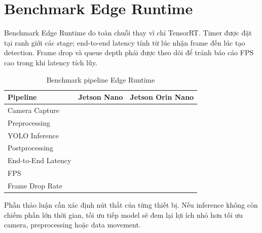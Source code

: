 \section{Benchmark Edge Runtime}

Benchmark Edge Runtime đo toàn chuỗi thay vì chỉ TensorRT. Timer được đặt tại
ranh giới các stage; end-to-end latency tính từ lúc nhận frame đến lúc tạo detection.
Frame drop và queue depth phải được theo dõi để tránh báo cáo FPS cao trong khi
latency tích lũy.

\begin{table}[H]
\centering
\caption{Benchmark pipeline Edge Runtime}
\label{tab:runtime-pipeline-benchmark}
\begin{tabularx}{\textwidth}{L{6cm}YY}
\toprule
\textbf{Pipeline} & \textbf{Jetson Nano} & \textbf{Jetson Orin Nano}\\
\midrule
Camera Capture &  & \\
Preprocessing &  & \\
YOLO Inference &  & \\
Postprocessing &  & \\
End-to-End Latency &  & \\
FPS & \cbs{} & \cbs{}\\
Frame Drop Rate & \cbs{} & \cbs{}\\
\bottomrule
\end{tabularx}
\end{table}

Phần thảo luận cần xác định nút thắt của từng thiết bị. Nếu inference không còn
chiếm phần lớn thời gian, tối ưu tiếp model sẽ đem lại lợi ích nhỏ hơn tối ưu camera,
preprocessing hoặc data movement.
